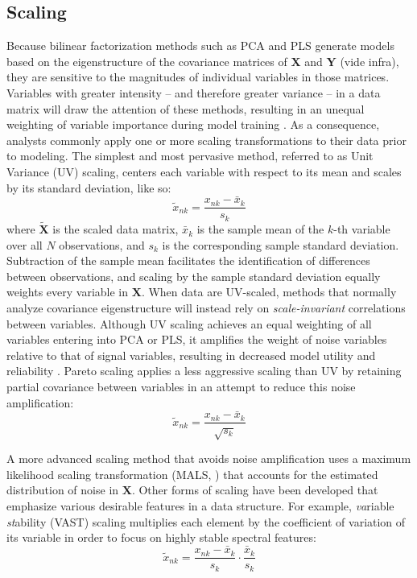 \subsection{Scaling}

\begin{doublespace}
Because bilinear factorization methods such as PCA and PLS generate models
based on the eigenstructure of the covariance matrices of $\mathbf{X}$ and
$\mathbf{Y}$ (vide infra), they are sensitive to the magnitudes of individual
variables in those matrices. Variables with greater intensity -- and therefore
greater variance -- in a data matrix will draw the attention of these methods,
resulting in an unequal weighting of variable importance during model training
\cite{jolliffe2002,smilde:anchem2005,vandenberg:bmcg2006}. As a consequence,
analysts commonly apply one or more scaling transformations to their data prior
to modeling. The simplest and most pervasive method, referred to as Unit
Variance (UV) scaling, centers each variable with respect to its mean and
scales by its standard deviation, like so:
\begin{equation}
\tilde{x}_{nk} = \frac{x_{nk} - \bar{x}_k}{s_k}
\end{equation}
where $\widetilde{\mathbf{X}}$ is the scaled data matrix, $\bar{x}_k$ is the
sample mean of the $k$-th variable over all $N$ observations, and $s_k$ is the
corresponding sample standard deviation. Subtraction of the sample mean
facilitates the identification of differences between observations, and
scaling by the sample standard deviation equally weights every variable
in $\mathbf{X}$. When data are UV-scaled, methods that normally analyze
covariance eigenstructure will instead rely on {\it scale-invariant}
correlations between variables. Although UV scaling achieves an equal weighting
of all variables entering into PCA or PLS, it amplifies the weight of noise
variables relative to that of signal variables, resulting in decreased model
utility and reliability \cite{hoefsloot:jchemo2006}. Pareto scaling applies a
less aggressive scaling than UV by retaining partial covariance between
variables in an attempt to reduce this noise amplification:
\begin{equation}
\tilde{x}_{nk} = \frac{x_{nk} - \bar{x}_k}{\sqrt{s_k}}
\end{equation}

A more advanced scaling method that avoids noise amplification uses a maximum
likelihood scaling transformation (MALS, \cite{hoefsloot:jchemo2006}) that
accounts for the estimated distribution of noise in $\mathbf{X}$. Other forms
of scaling have been developed that emphasize various desirable features in
a data structure. For example, {\it va}riable {\it st}ability (VAST) scaling
multiplies each element by the coefficient of variation of its variable in
order to focus on highly stable spectral features:
\begin{equation}
\tilde{x}_{nk}
 = \frac{x_{nk} - \bar{x}_k}{s_k} \cdot
   \frac{\bar{x}_k}{s_k}
\end{equation}


\end{doublespace}
